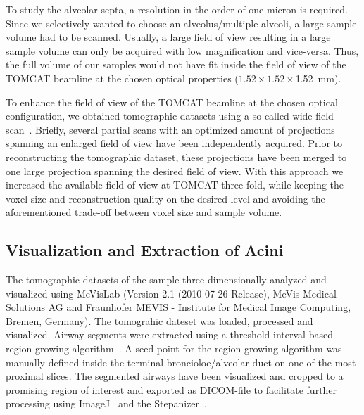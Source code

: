 \documentclass[%
	paper=a4,%
	twoside=true,%
	draft=false,%
	abstract=false]{scrartcl}
\begin{document}
To study the alveolar septa, a resolution in the order of one micron is required. Since we selectively wanted to choose an alveolus/multiple alveoli, a large sample volume had to be scanned. Usually, a large field of view resulting in a large sample volume can only be acquired with low magnification and vice-versa. Thus, the full volume of our samples would not have fit inside the field of view of the TOMCAT beamline at the chosen optical properties (\(1.52\times1.52\times\)\SI{1.52}{\milli\meter}).

To enhance the field of view of the TOMCAT beamline at the chosen optical configuration, we obtained tomographic datasets using a so called wide field scan~\cite{Haberthuer2010}. Briefly, several partial scans with an optimized amount of projections spanning an enlarged field of view have been independently acquired. Prior to reconstructing the tomographic dataset, these projections have been merged to one large projection spanning the desired field of view. With this approach we increased the available field of view at TOMCAT three-fold, while keeping the voxel size and reconstruction quality on the desired level and avoiding the aforementioned trade-off between voxel size and sample volume.

\subsection{Visualization and Extraction of Acini}
The tomographic datasets of the sample three-dimensionally analyzed and visualized using MeVisLab (Version 2.1 (2010-07-26 Release), MeVis Medical Solutions AG and Fraunhofer MEVIS - Institute for Medical Image Computing, Bremen, Germany). The tomograhic dateset was loaded, processed and visualized. Airway segments were extracted using a threshold interval based region growing algorithm~\cite{Zucker1976}. A seed point for the region growing algorithm was manually defined inside the terminal broncioloe/alveolar duct on one of the most proximal slices. The segmented airways have been visualized and cropped to a promising region of interest and exported as DICOM-file to facilitate further processing using ImageJ~\cite{Abramoff2004} and the Stepanizer~\cite{Tschanz2010}.
\end{document}
